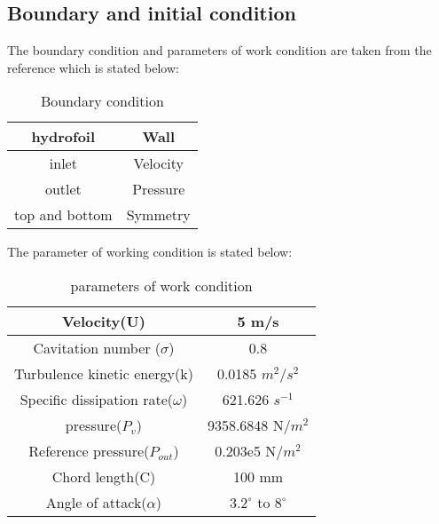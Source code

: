 \subsection{Boundary and initial condition}
The boundary condition and parameters of work condition  are taken from the reference
\cite{Zhao2021} which is stated below:
\begin{table}[h]
    \centering
    \begin{tabular}{|c|c|}
    \hline
        hydrofoil & Wall \\
    \hline
        inlet & Velocity \\ 
    \hline
       outlet & Pressure  \\
    \hline
       top and bottom & Symmetry \\
   \hline
    \end{tabular}
    \caption{Boundary condition}
    \label{tab:BC}
\end{table}
The parameter of working condition is stated below:
\begin{table}[h]
    \centering
    \begin{tabular}{|c|c|}
    \hline
        Velocity(U) & 5 m/s \\
    \hline
        Cavitation number ($\sigma$) & 0.8 \\ 
    \hline
     Turbulence kinetic energy(k) & 0.0185 $m^2$/$s^2$ \\
    \hline
    Specific dissipation rate($\omega$) & 621.626 $s^{-1}$ \\
    \hline
    pressure($P_v$) & 9358.6848 N/${m}^2$\\
    \hline
    Reference pressure($P_{out}$) &  0.203e5 N/${m}^2$ \\
    \hline
    Chord length(C) & 100 mm \\
    \hline
    Angle of attack($\alpha$) & ${3.2}^{\circ}$ to ${8}^{\circ}$ \\
   \hline
    \end{tabular}
    \caption{parameters of work condition}
    \label{tab:PC}
\end{table}
